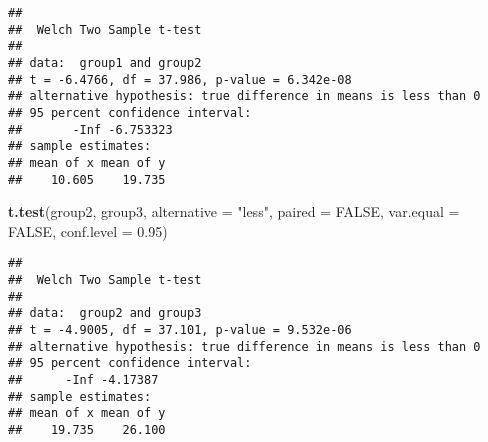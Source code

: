 \documentclass[]{article}
\newenvironment{Shaded}{\begin{snugshade}}{\end{snugshade}}
\newcommand{\KeywordTok}[1]{\textcolor[rgb]{0.13,0.29,0.53}{\textbf{#1}}}
\newcommand{\DataTypeTok}[1]{\textcolor[rgb]{0.13,0.29,0.53}{#1}}
\newcommand{\FloatTok}[1]{\textcolor[rgb]{0.00,0.00,0.81}{#1}}
\newcommand{\StringTok}[1]{\textcolor[rgb]{0.31,0.60,0.02}{#1}}
\newcommand{\OtherTok}[1]{\textcolor[rgb]{0.56,0.35,0.01}{#1}}
\newcommand{\OperatorTok}[1]{\textcolor[rgb]{0.81,0.36,0.00}{\textbf{#1}}}
\newcommand{\NormalTok}[1]{#1}
\begin{document}
\begin{Shaded}
\end{Shaded}

\begin{verbatim}
## 
##  Welch Two Sample t-test
## 
## data:  group1 and group2
## t = -6.4766, df = 37.986, p-value = 6.342e-08
## alternative hypothesis: true difference in means is less than 0
## 95 percent confidence interval:
##       -Inf -6.753323
## sample estimates:
## mean of x mean of y 
##    10.605    19.735
\end{verbatim}

\begin{Shaded}
\begin{Highlighting}[]
\KeywordTok{t.test}\NormalTok{(group2, group3, }\DataTypeTok{alternative =} \StringTok{"less"}\NormalTok{, }\DataTypeTok{paired =} \OtherTok{FALSE}\NormalTok{, }\DataTypeTok{var.equal =} \OtherTok{FALSE}\NormalTok{, }\DataTypeTok{conf.level =} \FloatTok{0.95}\NormalTok{)}
\end{Highlighting}
\end{Shaded}

\begin{verbatim}
## 
##  Welch Two Sample t-test
## 
## data:  group2 and group3
## t = -4.9005, df = 37.101, p-value = 9.532e-06
## alternative hypothesis: true difference in means is less than 0
## 95 percent confidence interval:
##      -Inf -4.17387
## sample estimates:
## mean of x mean of y 
##    19.735    26.100
\end{verbatim}
\end{document}
